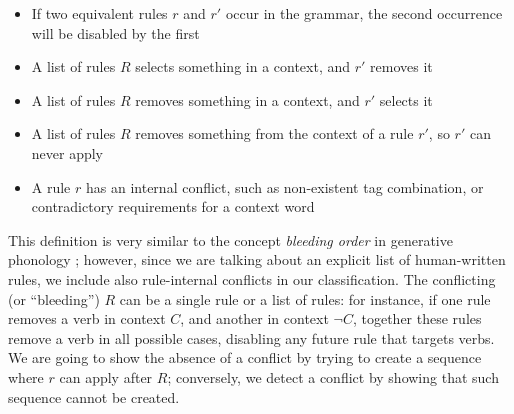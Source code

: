 \begin{itemize}
\item If two equivalent rules $r$ and $r'$ occur in the grammar, the second occurrence will be disabled by the first
\item A list of rules $R$ selects something in a context, and $r'$ removes it
\item A list of rules $R$ removes something in a context, and $r'$ selects it
\item A list of rules $R$ removes something from the context of a rule $r'$, so $r'$ can never apply
\item A rule $r$ has an internal conflict, such as non-existent
tag combination, or contradictory requirements for a context word
\end{itemize}

This definition is very similar to the concept \emph{bleeding order}
in generative phonology \cite{kiparsky1968}; however, since we are
talking about an explicit list of human-written rules, we include also
rule-internal conflicts in our classification. The conflicting (or
``bleeding'') $R$ can be a single rule or a list of rules: for
instance, if one rule removes a verb in context $C$, and another in
context $\neg C$, together these rules remove a verb in all possible
cases, disabling any future rule that targets verbs.
We are going to show the absence of a conflict by trying to create 
a sequence where $r$ can apply after $R$; conversely, we detect a conflict by 
showing that such sequence cannot be created.





